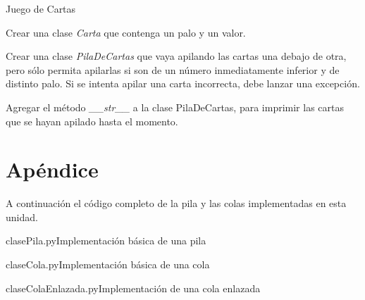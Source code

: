 \begin{ejercicio}
Juego de Cartas
\begin{partes}
    \item Crear una clase {\it Carta} que contenga un palo y un valor.
    \item Crear una clase {\it PilaDeCartas} que vaya apilando las cartas una
debajo de otra, pero sólo permita apilarlas si son de un número
inmediatamente inferior y de distinto palo. Si se intenta apilar una carta
incorrecta, debe lanzar una excepción.
    \item Agregar el método {\it \_\_str\_\_} a la clase PilaDeCartas, para
imprimir las cartas que se hayan apilado hasta el momento.
\end{partes}
\end{ejercicio}

\newpage
\section{Apéndice}

A continuación el código completo de la pila y las colas implementadas en
esta unidad.

\begin{codigo}{clasePila.py}{Implementación básica de una pila}

\end{codigo}

\begin{codigo}{claseCola.py}{Implementación básica de una cola}

\end{codigo}

\begin{codigo}{claseColaEnlazada.py}{Implementación de una cola enlazada}

\end{codigo}


